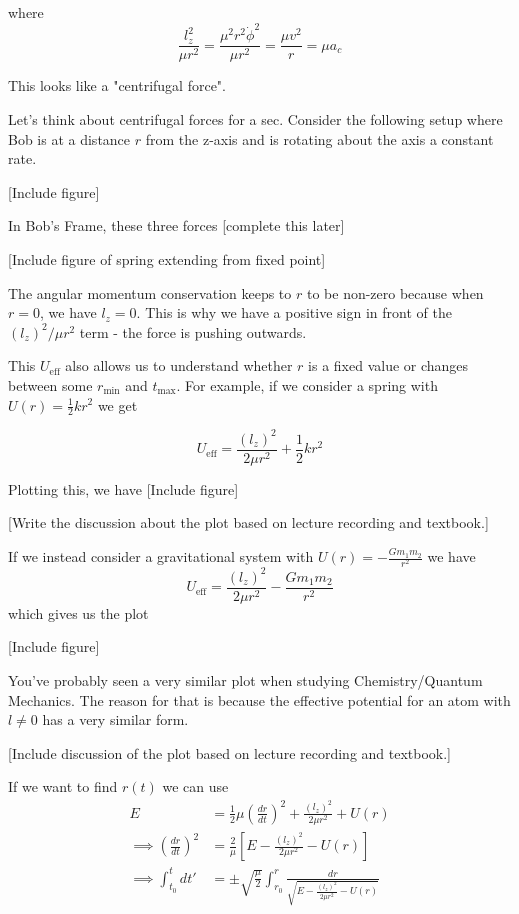 \documentclass[11pt]{article}
\begin{document}
where 
\[ \frac{l_{z}^{2}}{\mu r^2} =\frac{\mu^2r^2\dot{\phi}^2}{\mu r^2} = \frac{\mu v^2}{r} = \mu a_{c} \]

\vskip 0.25cm
This looks like a "centrifugal force".

\begin{redbox}
  Let's think about centrifugal forces for a sec. Consider the following setup where Bob is at a distance $r$ from the z-axis and is rotating about the axis a constant rate.

  \vskip 0.5cm
  [Include figure]
  \vskip 0.5cm

  In Bob's Frame, these three forces [complete this later]
\end{redbox}

\vskip 0.5cm
[Include figure of spring extending from fixed point]


\vskip 0.5cm
The angular momentum conservation keeps to $r$ to be non-zero because when $r = 0$, we have $l_z = 0$. This is why we have a positive sign in front of the $(l_z)^2 / \mu r^2$ term - the force is pushing outwards.


\vskip 0.5cm
This $U_{\text{eff}}$ also allows us to understand whether $r$ is a fixed value or changes between some $r_{\text{min}}$ and $t_{\text{max}}$. For example, if we consider a spring with $U(r) = \frac{1}{2} kr^2$ we get 

\[ U_{\text{eff}} = \frac{(l_z)^2}{2\mu r^2} + \frac{1}{2} kr^2 \]

Plotting this, we have
[Include figure]


[Write the discussion about the plot based on lecture recording and textbook.]

\vskip 0.5cm
If we instead consider a gravitational system with $U(r) = -\frac{G m_1 m_2}{r^2}$ we have 
\[ U_{\text{eff}} = \frac{(l_z)^2}{2\mu r^2} - \frac{Gm_1m_2}{r^2} \] which gives us the plot 

\vskip 0.5cm
[Include figure]

\vskip 0.5cm
You've probably seen a very similar plot when studying Chemistry/Quantum Mechanics. The reason for that is because the effective potential for an atom with $l \neq 0$ has a very similar form.

\vskip 0.5cm
[Include discussion of the plot based on lecture recording and textbook.]

\vskip 0.5cm
If we want to find $r(t)$ we can use 
\begin{align*}
  E &= \frac{1}{2} \mu \left(\frac{dr}{dt}\right)^2 + \frac{(l_z)^2}{2\mu r^2} + U(r) \\
  \implies \left(\frac{dr}{dt}\right)^2 &= \frac{2}{\mu} \left[ E - \frac{(l_z)^2}{2\mu r^2} - U(r) \right] \\
  \implies \int_{t_{0}}^{t} dt' &= \pm \sqrt{\frac{\mu}{2}} \int_{r_{0}}^{r} \frac{dr}{ \sqrt{E - \frac{(l_z)^2}{2\mu r^2} - U(r) }}
\end{align*}
\end{document}
